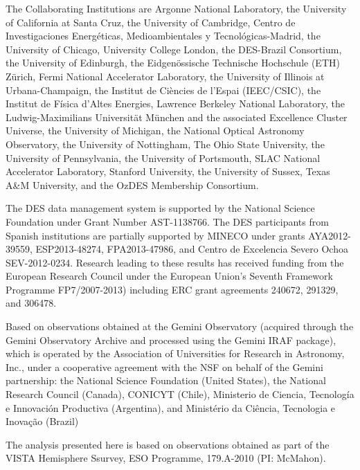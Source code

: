 \documentclass[twocolumn]{aastex6}
\begin{document}
The Collaborating Institutions are Argonne National Laboratory, the University of California at Santa Cruz, the University of Cambridge, Centro de Investigaciones Energ{\'e}ticas, 
Medioambientales y Tecnol{\'o}gicas-Madrid, the University of Chicago, University College London, the DES-Brazil Consortium, the University of Edinburgh, 
the Eidgen{\"o}ssische Technische Hochschule (ETH) Z{\"u}rich, 
Fermi National Accelerator Laboratory, the University of Illinois at Urbana-Champaign, the Institut de Ci{\`e}ncies de l'Espai (IEEC/CSIC), 
the Institut de F{\'i}sica d'Altes Energies, Lawrence Berkeley National Laboratory, the Ludwig-Maximilians Universit{\"a}t M{\"u}nchen and the associated Excellence Cluster Universe, 
the University of Michigan, the National Optical Astronomy Observatory, the University of Nottingham, The Ohio State University, the University of Pennsylvania, the University of Portsmouth, 
SLAC National Accelerator Laboratory, Stanford University, the University of Sussex, Texas A\&M University, and the OzDES Membership Consortium.

The DES data management system is supported by the National Science Foundation under Grant Number AST-1138766.
The DES participants from Spanish institutions are partially supported by MINECO under grants AYA2012-39559, ESP2013-48274, FPA2013-47986, and Centro de Excelencia Severo Ochoa SEV-2012-0234.
Research leading to these results has received funding from the European Research Council under the European Union's Seventh Framework Programme FP7/2007-2013) including ERC grant agreements 240672, 291329, and 306478.

Based on observations obtained at the Gemini Observatory (acquired through the Gemini Observatory Archive and processed using the Gemini IRAF package), which is operated by the Association of Universities for Research in Astronomy, Inc., under a cooperative agreement with the NSF on behalf of the Gemini partnership: the National Science Foundation (United States), the National Research Council (Canada), CONICYT (Chile), Ministerio de Ciencia, Tecnolog\'{i}a e Innovaci\'{o}n Productiva (Argentina), and Minist\'{e}rio da Ci\^{e}ncia, Tecnologia e Inova\c{c}\~{a}o (Brazil)

The analysis presented here is based on observations obtained as part of the VISTA Hemisphere Ssurvey, ESO Programme, 179.A-2010 (PI: McMahon).
\end{document}
